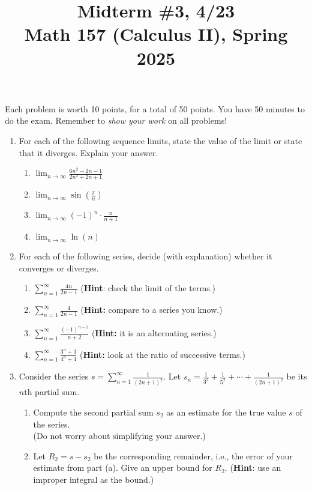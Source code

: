 \documentclass[11pt]{article}
\title{Midterm \#3, 4/23 \\ Math 157 (Calculus II), Spring 2025}
\date{}
\begin{document}
\maketitle

\thispagestyle{empty}

\vspace{-2cm}

Each problem is worth 10 points, for a total of 50 points. You have 50 minutes to do the exam. Remember to \emph{show your work} on all problems!

\begin{enumerate}

\item For each of the following sequence limits, state the value of the limit or state that it diverges. Explain your answer.
\begin{enumerate}
\item $\displaystyle \lim_{n\to \infty} \frac{6n^2-2n-1}{2n^2+2n+1}$
\item $\displaystyle \lim_{n\to \infty} \sin(\frac{\pi}{n})$
\item $\displaystyle \lim_{n\to \infty} (-1)^n \cdot \frac{n}{n+1}$
\item $\displaystyle \lim_{n\to \infty} \ln(n)$
\end{enumerate}

\item For each of the following series, decide (with explanation) whether it converges or diverges.
\begin{enumerate}
\item $\displaystyle \sum_{n=1}^{\infty} \frac{4n}{2n-1}$ \hfill ({\bf Hint}: check the limit of the terms.)
\item $\displaystyle \sum_{n=1}^{\infty} \frac{4}{2n-1}$ \hfill ({\bf Hint:} compare to a series you know.)
\item $\displaystyle \sum_{n=1}^{\infty} \frac{(-1)^{n-1}}{n+2}$ \hfill ({\bf Hint:} it is an alternating series.)
\item $\displaystyle \sum_{n=1}^{\infty} \frac{3^n+3}{4^n+4}$ \hfill ({\bf Hint:} look at the ratio of successive terms.)
\end{enumerate}

\item Consider the series $s=\displaystyle \sum_{n=1}^{\infty} \frac{1}{(2n+1)^2}$. Let $s_n = \frac{1}{3^2} + \frac{1}{5^2} + \cdots + \frac{1}{(2n+1)^2}$ be its $n$th partial sum.
\begin{enumerate}
\item Compute the second partial sum $s_2$ as an estimate for the true value $s$ of the series. \\ (Do not worry about simplifying your answer.)
\item Let $R_2 = s - s_2$ be the corresponding remainder, i.e., the error of your estimate from part (a). Give an upper bound for $R_2$. ({\bf Hint}: use an improper integral as the bound.)
\end{enumerate}


\end{enumerate}
\end{document}
